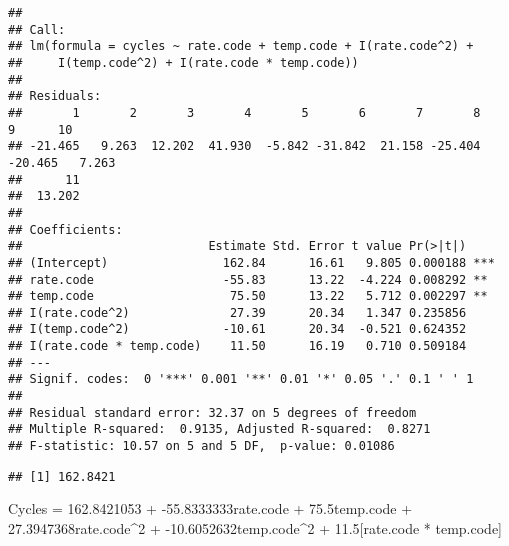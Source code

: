 \documentclass[
]{article}
\newenvironment{Shaded}{\begin{snugshade}}{\end{snugshade}}
\newcommand{\DecValTok}[1]{\textcolor[rgb]{0.00,0.00,0.81}{#1}}
\newcommand{\FunctionTok}[1]{\textcolor[rgb]{0.13,0.29,0.53}{\textbf{#1}}}
\newcommand{\NormalTok}[1]{#1}
\newcommand{\SpecialCharTok}[1]{\textcolor[rgb]{0.81,0.36,0.00}{\textbf{#1}}}
\begin{document}
\begin{verbatim}
## 
## Call:
## lm(formula = cycles ~ rate.code + temp.code + I(rate.code^2) + 
##     I(temp.code^2) + I(rate.code * temp.code))
## 
## Residuals:
##       1       2       3       4       5       6       7       8       9      10 
## -21.465   9.263  12.202  41.930  -5.842 -31.842  21.158 -25.404 -20.465   7.263 
##      11 
##  13.202 
## 
## Coefficients:
##                          Estimate Std. Error t value Pr(>|t|)    
## (Intercept)                162.84      16.61   9.805 0.000188 ***
## rate.code                  -55.83      13.22  -4.224 0.008292 ** 
## temp.code                   75.50      13.22   5.712 0.002297 ** 
## I(rate.code^2)              27.39      20.34   1.347 0.235856    
## I(temp.code^2)             -10.61      20.34  -0.521 0.624352    
## I(rate.code * temp.code)    11.50      16.19   0.710 0.509184    
## ---
## Signif. codes:  0 '***' 0.001 '**' 0.01 '*' 0.05 '.' 0.1 ' ' 1
## 
## Residual standard error: 32.37 on 5 degrees of freedom
## Multiple R-squared:  0.9135, Adjusted R-squared:  0.8271 
## F-statistic: 10.57 on 5 and 5 DF,  p-value: 0.01086
\end{verbatim}

\begin{Shaded}
\end{Shaded}

\begin{verbatim}
## [1] 162.8421
\end{verbatim}

Cycles = 162.8421053 + -55.8333333rate.code + 75.5temp.code +
27.3947368rate.code\^{}2 + -10.6052632temp.code\^{}2 + 11.5{[}rate.code
* temp.code{]}
\end{document}
